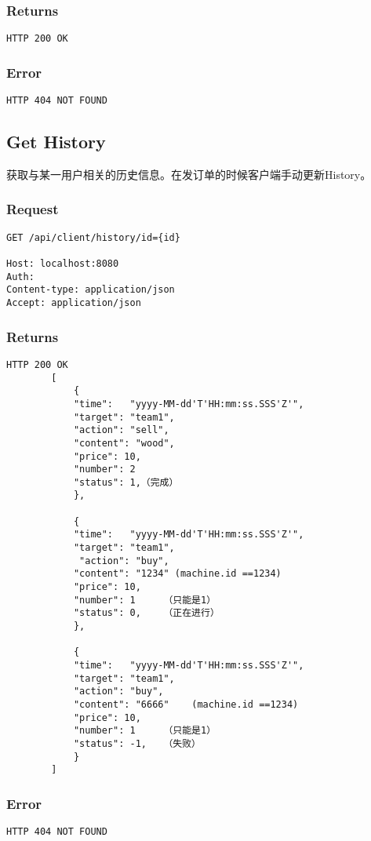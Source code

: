 \documentclass{article}
\begin{document}
\subsubsection*{Returns}
\begin{lstlisting}
HTTP 200 OK
\end{lstlisting}
\subsubsection*{Error}
\begin{lstlisting}
HTTP 404 NOT FOUND
\end{lstlisting}







\subsection{Get History}
获取与某一用户相关的历史信息。在发订单的时候客户端手动更新History。
\subsubsection*{Request}
\begin{lstlisting}
GET /api/client/history/id={id}

Host: localhost:8080
Auth:
Content-type: application/json
Accept: application/json
\end{lstlisting}
\subsubsection*{Returns}
\begin{lstlisting}
HTTP 200 OK
		[
			{
			"time":   "yyyy-MM-dd'T'HH:mm:ss.SSS'Z'",
			"target": "team1",
			"action": "sell",
			"content": "wood",
			"price": 10,
			"number": 2
			"status": 1,（完成）
			},

			{
			"time":   "yyyy-MM-dd'T'HH:mm:ss.SSS'Z'",
			"target": "team1",
			 "action": "buy",
			"content": "1234" (machine.id ==1234)
			"price": 10,
			"number": 1   	（只能是1）
			"status": 0,	（正在进行）
			},

			{
			"time":   "yyyy-MM-dd'T'HH:mm:ss.SSS'Z'",
			"target": "team1",
			"action": "buy",
			"content": "6666"    (machine.id ==1234)
			"price": 10,
			"number": 1   	（只能是1）
			"status": -1,	（失败）
			}
		]\end{lstlisting}
\subsubsection*{Error}
\begin{lstlisting}
HTTP 404 NOT FOUND
\end{lstlisting}
\end{document}

